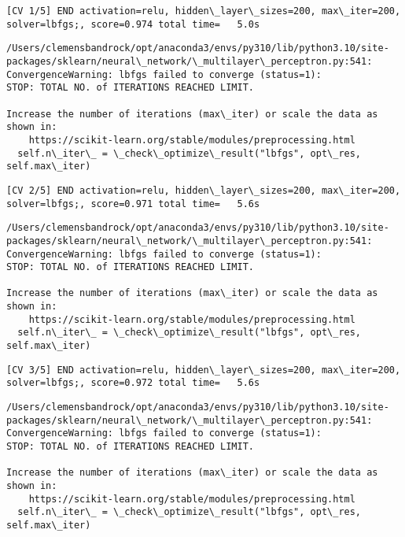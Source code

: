 \documentclass[11pt]{article}
\begin{document}
    \begin{Verbatim}[commandchars=\\\{\}]
[CV 1/5] END activation=relu, hidden\_layer\_sizes=200, max\_iter=200,
solver=lbfgs;, score=0.974 total time=   5.0s
    \end{Verbatim}

    \begin{Verbatim}[commandchars=\\\{\}]
/Users/clemensbandrock/opt/anaconda3/envs/py310/lib/python3.10/site-
packages/sklearn/neural\_network/\_multilayer\_perceptron.py:541:
ConvergenceWarning: lbfgs failed to converge (status=1):
STOP: TOTAL NO. of ITERATIONS REACHED LIMIT.

Increase the number of iterations (max\_iter) or scale the data as shown in:
    https://scikit-learn.org/stable/modules/preprocessing.html
  self.n\_iter\_ = \_check\_optimize\_result("lbfgs", opt\_res, self.max\_iter)
    \end{Verbatim}

    \begin{Verbatim}[commandchars=\\\{\}]
[CV 2/5] END activation=relu, hidden\_layer\_sizes=200, max\_iter=200,
solver=lbfgs;, score=0.971 total time=   5.6s
    \end{Verbatim}

    \begin{Verbatim}[commandchars=\\\{\}]
/Users/clemensbandrock/opt/anaconda3/envs/py310/lib/python3.10/site-
packages/sklearn/neural\_network/\_multilayer\_perceptron.py:541:
ConvergenceWarning: lbfgs failed to converge (status=1):
STOP: TOTAL NO. of ITERATIONS REACHED LIMIT.

Increase the number of iterations (max\_iter) or scale the data as shown in:
    https://scikit-learn.org/stable/modules/preprocessing.html
  self.n\_iter\_ = \_check\_optimize\_result("lbfgs", opt\_res, self.max\_iter)
    \end{Verbatim}

    \begin{Verbatim}[commandchars=\\\{\}]
[CV 3/5] END activation=relu, hidden\_layer\_sizes=200, max\_iter=200,
solver=lbfgs;, score=0.972 total time=   5.6s
    \end{Verbatim}

    \begin{Verbatim}[commandchars=\\\{\}]
/Users/clemensbandrock/opt/anaconda3/envs/py310/lib/python3.10/site-
packages/sklearn/neural\_network/\_multilayer\_perceptron.py:541:
ConvergenceWarning: lbfgs failed to converge (status=1):
STOP: TOTAL NO. of ITERATIONS REACHED LIMIT.

Increase the number of iterations (max\_iter) or scale the data as shown in:
    https://scikit-learn.org/stable/modules/preprocessing.html
  self.n\_iter\_ = \_check\_optimize\_result("lbfgs", opt\_res, self.max\_iter)
    \end{Verbatim}
\end{document}
